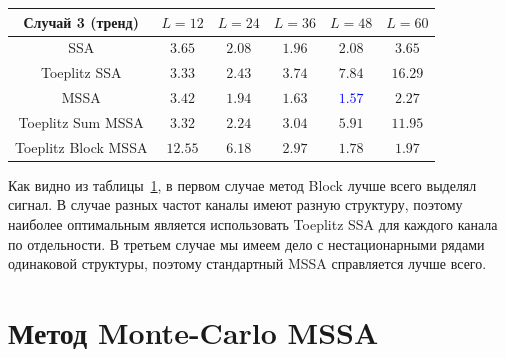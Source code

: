 \documentclass[specialist,
substylefile = spbu_report.rtx,
subf,href,colorlinks=true, 12pt]{disser}
\theoremstyle{definition}
\begin{document}
\begin{table}[h]
\begin{tabular}{cccccc}
			\hhline{======}
			Случай 3 (тренд)                 & $L=12$  & $L=24$                     & $L=36$                     & $L=48$                     & $L=60$          \\
			\hline
			SSA                              & $3.65$  & $2.08$                     & $\mathbf{1.96}$            & $2.08$                     & $3.65$          \\
			\hline
			Toeplitz SSA                     & $3.33$  & $\mathbf{2.43}$            & $3.74$                     & $7.84$                     & $16.29$         \\
			\hline
			MSSA                             & $3.42$  & $1.94$                     & $1.63$                     & \textcolor{blue}{${\mathbf{1.57}}$} & $2.27$          \\
			\hline
			Toeplitz Sum MSSA                & $3.32$  & $\mathbf{2.24}$            & $3.04$                     & $5.91$                     & $11.95$         \\
			\hline
			Toeplitz Block MSSA              & $12.55$ & $6.18$                     & $2.97$                     & $\mathbf{1.78}$            & $1.97$          \\
			\hline
		\end{tabular}
	\label{tab:mse}
\end{table}

Как видно из таблицы~\ref{tab:mse}, в первом случае метод Block лучше всего выделял сигнал. В случае разных частот каналы имеют разную структуру, поэтому наиболее оптимальным является использовать Toeplitz SSA для каждого канала по отдельности.  В третьем случае мы имеем дело с нестационарными рядами одинаковой структуры, поэтому стандартный MSSA справляется лучше всего.

\chapter{Метод Monte-Carlo MSSA}
\end{document}
